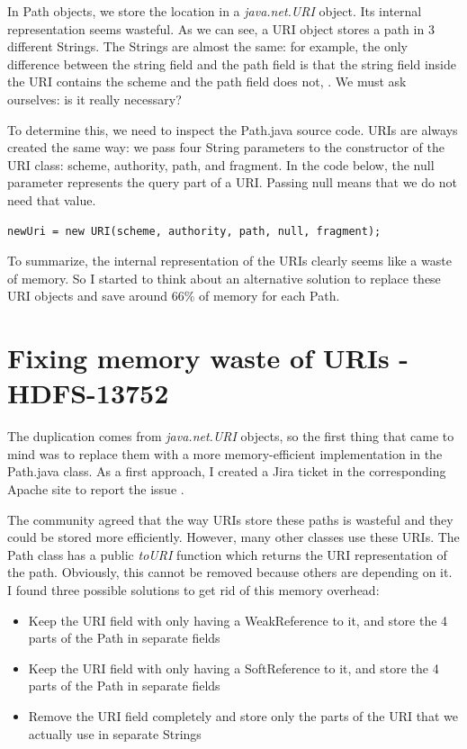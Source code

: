 In Path objects, we store the location in a \textit{java.net.URI} object. Its internal representation seems wasteful. As we can see, a URI object stores a path in 3 different Strings. The Strings are almost the same: for example, the only difference between the string field and the path field is that the string field inside the URI contains the scheme and the path field does not, \etc. We must ask ourselves: is it really necessary?

To determine this, we need to inspect the Path.java source code. URIs are always created the same way: we pass four String parameters to the constructor of the URI class: scheme, authority, path, and fragment. In the code below, the null parameter represents the query part of a URI. Passing null means that we do not need that value.

\begin{lstlisting}
newUri = new URI(scheme, authority, path, null, fragment);
\end{lstlisting}

To summarize, the internal representation of the URIs clearly seems like a waste of memory. So I started to think about an alternative solution to replace these URI objects and save around 66\% of memory for each Path. 

\chapter{Fixing memory waste of URIs - HDFS-13752}
The duplication comes from \textit{java.net.URI} objects, so the first thing that came to mind was to replace them with a more memory-efficient implementation in the Path.java class. As a first approach, I created a Jira ticket in the corresponding Apache site to report the issue \cite{hdfs-path}. 

The community agreed that the way URIs store these paths is wasteful and they could be stored more efficiently. However, many other classes use these URIs. The Path class has a public \textit{toURI} function which returns the URI representation of the path. Obviously, this cannot be removed because others are depending on it. I found three possible solutions to get rid of this memory overhead:

\begin{itemize}
	\item Keep the URI field with only having a WeakReference to it, and store the 4 parts of the Path in separate fields
	\item Keep the URI field with only having a SoftReference to it, and store the 4 parts of the Path in separate fields
	\item Remove the URI field completely and store only the parts of the URI that we actually use in separate Strings
\end{itemize}
